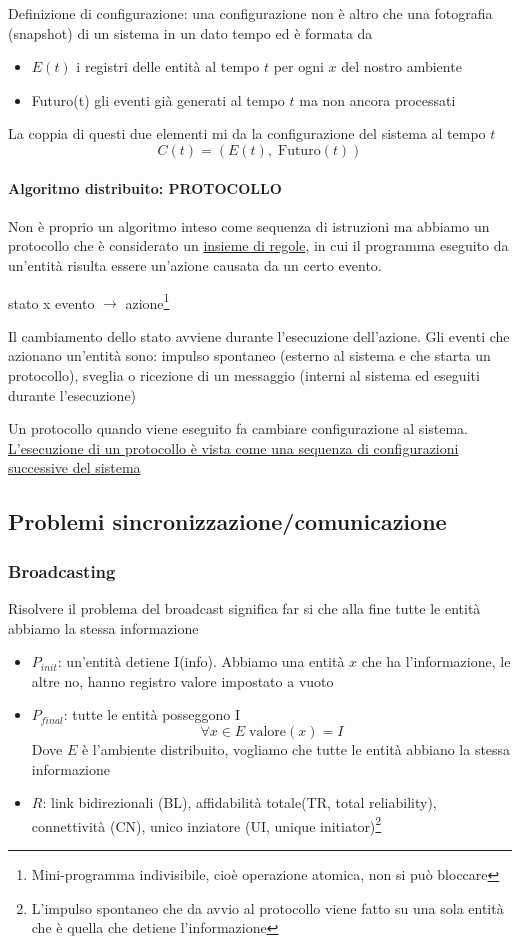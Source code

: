 \begin{definizione}
    Definizione di configurazione: una configurazione non è altro che una fotografia (snapshot) di un sistema in un dato tempo ed è formata da
    \begin{itemize}
        \item $E(t)$ i registri delle entità al tempo $t$ per ogni $x$ del nostro ambiente
        \item Futuro(t) gli eventi già generati al tempo $t$ ma non ancora processati
    \end{itemize}
    La coppia di questi due elementi mi da la configurazione del sistema al tempo $t$
    $$C(t) = ( E(t),\;\text{Futuro}(t) )$$
\end{definizione}

\paragraph{Algoritmo distribuito: PROTOCOLLO}
Non è proprio un algoritmo inteso come sequenza di istruzioni ma abbiamo un protocollo che è considerato un \uline{insieme di regole}, in cui il programma eseguito da un'entità risulta essere un'azione causata da un certo evento. 

stato x evento $\rightarrow$ azione\footnote{Mini-programma indivisibile, cioè operazione atomica, non si può bloccare}

Il cambiamento dello stato avviene durante l'esecuzione dell'azione. Gli eventi che azionano un'entità sono: impulso spontaneo (esterno al sistema e che starta un protocollo), sveglia o ricezione di un messaggio (interni al sistema ed eseguiti durante l'esecuzione)

Un protocollo quando viene eseguito fa cambiare configurazione al sistema. \uline{L'esecuzione di un protocollo è vista come una sequenza di configurazioni successive del sistema}

\subsection{Problemi sincronizzazione/comunicazione}
\subsubsection{Broadcasting}
Risolvere il problema del broadcast significa far si che alla fine tutte le entità abbiamo la stessa
informazione
\begin{itemize}
    \item $P_{init}$: un'entità detiene I(info). Abbiamo una entità $x$ che ha l'informazione, le altre no, hanno registro valore impostato a vuoto
    \item $P_{final}$: tutte le entità posseggono I
    $$\forall x \in E \;\text{valore}(x) = I$$
    Dove $E$ è l'ambiente distribuito, vogliamo che tutte le entità abbiano la stessa informazione
    \item $R$: link bidirezionali (BL), affidabilità totale(TR, total reliability), connettività (CN), unico inziatore (UI, unique initiator)\footnote{L'impulso spontaneo che da avvio al protocollo viene fatto su una sola entità che è quella che detiene l'informazione}
\end{itemize}

